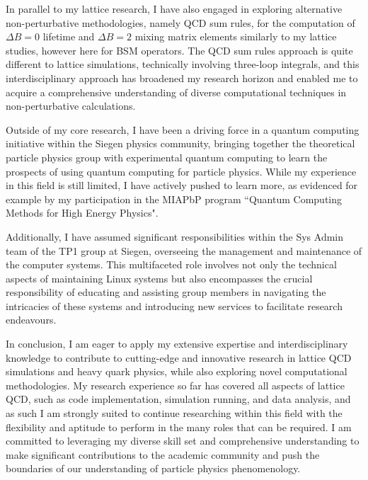\documentclass[11pt, a4paper]{awesome-cv}
\begin{document}
\begin{cvletter}
In parallel to my lattice research, I have also engaged in exploring alternative non-perturbative methodologies, namely QCD sum rules, for the computation of $\Delta B=0$ lifetime and $\Delta B=2$ mixing matrix elements similarly to my lattice studies, however here for BSM operators.
The QCD sum rules approach is quite different to lattice simulations, technically involving three-loop integrals, and this interdisciplinary approach has broadened my research horizon and enabled me to acquire a comprehensive understanding of diverse computational techniques in non-perturbative calculations.

\pagebreak
Outside of my core research, I have been a driving force in a quantum computing initiative within the Siegen physics community, bringing together the theoretical particle physics group with experimental quantum computing to learn the prospects of using quantum computing for particle physics. 
While my experience in this field is still limited, I have actively pushed to learn more, as evidenced for example by my participation in the MIAPbP program ``Quantum Computing Methods for High Energy Physics".

Additionally, I have assumed significant responsibilities within the Sys Admin team of the TP1 group at Siegen, overseeing the management and maintenance of the computer systems. 
This multifaceted role involves not only the technical aspects of maintaining Linux systems but also encompasses the crucial responsibility of educating and assisting group members in navigating the intricacies of these systems and introducing new services to facilitate research endeavours.

In conclusion, I am eager to apply my extensive expertise and interdisciplinary knowledge to contribute to cutting-edge and innovative research in lattice QCD simulations and heavy quark physics, while also exploring novel computational methodologies. 
My research experience so far has covered all aspects of lattice QCD, such as code implementation, simulation running, and data analysis, and as such I am strongly suited to continue researching within this field with the flexibility and aptitude to perform in the many roles that can be required.
I am committed to leveraging my diverse skill set and comprehensive understanding to make significant contributions to the academic community and push the boundaries of our understanding of particle physics phenomenology.

\end{cvletter}

\makeletterclosing
\end{document}
